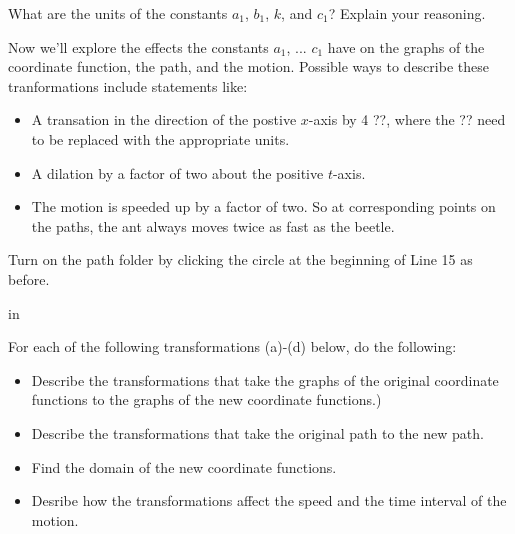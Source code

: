 \documentclass{ximera}
\newcommand{\pskip}{\vskip 0.1 in}
\begin{document}
\begin{example}
\begin{question}
What are the units of the constants $a_1$, $b_1$, $k$, and $c_1$? Explain your reasoning.
\end{question}


Now we'll explore the effects the constants $a_1$, ... $c_1$ have on the graphs of the coordinate function, the path, and the motion. Possible ways to describe these tranformations include statements like:

\begin{itemize}
\item{A transation in the direction of the postive $x$-axis by 4 ??, where the ?? need to be replaced with the appropriate units.}

\item{A dilation by a factor of two about the positive $t$-axis.}

\item{The motion is speeded up by a factor of two. So at corresponding points on the paths, the ant always moves twice as fast as the beetle.}

\end{itemize}



\begin{exploration}\label{exp:pc2c}
Turn on the path folder by clicking the circle at the beginning of Line 15 as before. 

\pskip

For each of the following transformations (a)-(d) below, do the following:

\begin{itemize}

\item{Describe the transformations that take the graphs of the original coordinate functions to the graphs of the new coordinate functions.)} 

\item{Describe the transformations that take the original path to the new path.}

\item{Find the domain of the new coordinate functions.}

\item{Desribe how the transformations affect the speed and the time interval of the motion.}


\end{itemize}
\end{exploration}
\end{example}
\end{document}
